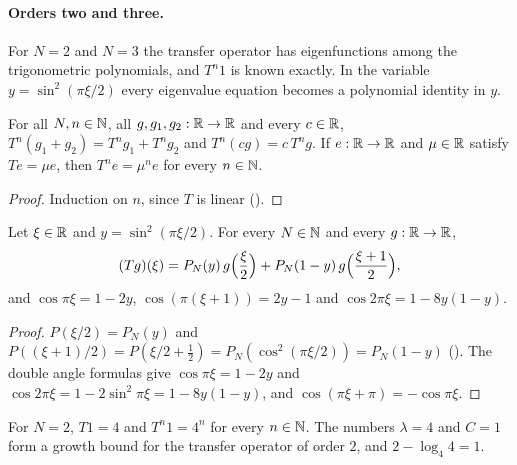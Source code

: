 \paragraph{Orders two and three.}
For $N = 2$ and $N = 3$ the transfer operator has eigenfunctions among the trigonometric
polynomials, and $T^n 1$ is known exactly. In the variable $y = \sin^2(\pi\xi/2)$ every
eigenvalue equation becomes a polynomial identity in $y$.

\begin{lemma}
\label{lem:daub-transfer-eigen}
\leanok
{}
For all $N, n \in \mathbb{N}$, all $g, g_1, g_2 : \mathbb{R} \to \mathbb{R}$ and every $c \in \mathbb{R}$,
$T^n (g_1 + g_2) = T^n g_1 + T^n g_2$ and $T^n (c g) = c \, T^n g$. If $e : \mathbb{R} \to \mathbb{R}$ and
$\mu \in \mathbb{R}$ satisfy $T e = \mu e$, then $T^n e = \mu^n e$ for every $n \in \mathbb{N}$.
\end{lemma}

\begin{proof}
\leanok
Induction on $n$, since $T$ is linear ().
\end{proof}

\begin{lemma}
\label{lem:daub-transfer-sin-sq}
\leanok
{}
Let $\xi \in \mathbb{R}$ and $y = \sin^2(\pi\xi/2)$. For every $N \in \mathbb{N}$ and every $g : \mathbb{R} \to \mathbb{R}$,
\[
  (T g)(\xi) = P_N(y) \, g\Bigl(\frac{\xi}{2}\Bigr)
    + P_N(1 - y) \, g\Bigl(\frac{\xi + 1}{2}\Bigr) ,
\]
and $\cos \pi\xi = 1 - 2y$, $\cos(\pi(\xi + 1)) = 2y - 1$ and $\cos 2\pi\xi = 1 - 8y(1 - y)$.
\end{lemma}

\begin{proof}
\leanok
{}
$P(\xi/2) = P_N(y)$ and
$P((\xi + 1)/2) = P(\xi/2 + \frac12) = P_N(\cos^2(\pi\xi/2)) = P_N(1 - y)$
(). The double angle formulas give $\cos \pi\xi = 1 - 2y$ and
$\cos 2\pi\xi = 1 - 2 \sin^2 \pi\xi = 1 - 8y(1 - y)$, and $\cos(\pi\xi + \pi) = -\cos \pi\xi$.
\end{proof}

\begin{proposition}
\label{prop:daub-transfer-two}
\leanok
{}
For $N = 2$, $T 1 = 4$ and $T^n 1 = 4^n$ for every $n \in \mathbb{N}$. The numbers $\lambda = 4$ and
$C = 1$ form a growth bound for the transfer operator of order $2$, and $2 - \log_4 4 = 1$.
\end{proposition}

